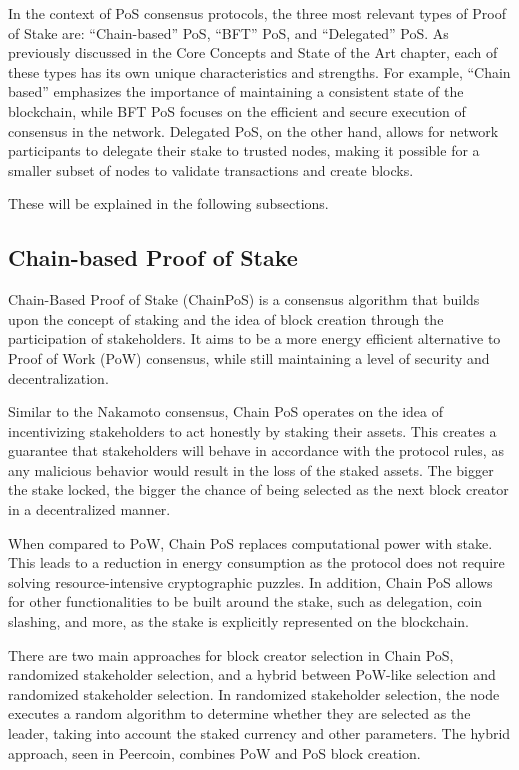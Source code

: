 In the context of PoS consensus protocols, the three most relevant types of Proof of Stake are: ``Chain-based'' PoS, ``BFT'' PoS, and ``Delegated'' PoS. As previously discussed in the Core Concepts and State of the Art chapter, each of these types has its own unique characteristics and strengths. For example, ``Chain based'' emphasizes the importance of maintaining a consistent state of the blockchain, while BFT PoS focuses on the efficient and secure execution of consensus in the network. Delegated PoS, on the other hand, allows for network participants to delegate their stake to trusted nodes, making it possible for a smaller subset of nodes to validate transactions and create blocks.

These will be explained in the following subsections.

\subsection*{\textbf{Chain-based Proof of Stake}}
Chain-Based Proof of Stake (ChainPoS) is a consensus algorithm that builds upon the concept of staking and the idea of block creation through the participation of stakeholders. It aims to be a more energy efficient alternative to Proof of Work (PoW) consensus, while still maintaining a level of security and decentralization.

Similar to the Nakamoto consensus, Chain PoS operates on the idea of incentivizing stakeholders to act honestly by staking their assets. This creates a guarantee that stakeholders will behave in accordance with the protocol rules, as any malicious behavior would result in the loss of the staked assets. The bigger the stake locked, the bigger the chance of being selected as the next block creator in a decentralized manner.

When compared to PoW, Chain PoS replaces computational power with stake. This leads to a reduction in energy consumption as the protocol does not require solving resource-intensive cryptographic puzzles. In addition, Chain PoS allows for other functionalities to be built around the stake, such as delegation, coin slashing, and more, as the stake is explicitly represented on the blockchain.

There are two main approaches for block creator selection in Chain PoS, randomized stakeholder selection, and a hybrid between PoW-like selection and randomized stakeholder selection. In randomized stakeholder selection, the node executes a random algorithm to determine whether they are selected as the leader, taking into account the staked currency and other parameters. The hybrid approach, seen in Peercoin, combines PoW and PoS block creation.

